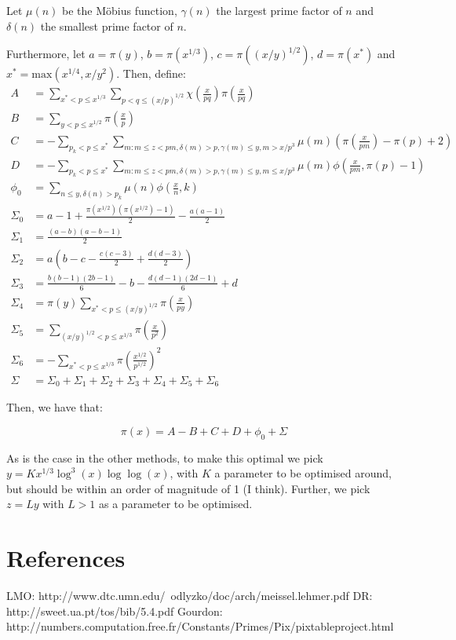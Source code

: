 \documentclass[12pt]{article}
\begin{document}
Let $\mu(n)$ be the M\"{o}bius function, $\gamma(n)$ the largest prime factor of $n$ and $\delta(n)$ the smallest prime factor of $n$.

Furthermore, let $a=\pi\left(y\right)$, $b=\pi\left(x^{1/3}\right)$, $c=\pi\left((x/y)^{1/2}\right)$, $d=\pi\left(x^*\right)$
and $x^*=\mathrm{max}\left(x^{1/4}, x/y^2\right)$. Then, define:
\begin{align*}
  A &= \sum_{x^* < p \leq x^{1/3}}\sum_{p < q \leq (x/p)^{1/2}}\chi\left(\frac{x}{pq}\right)\pi\left(\frac{x}{pq}\right)\\
  B &= \sum_{y < p \leq x^{1/2}}\pi\left(\frac{x}{p}\right)\\
  C &= -\sum_{p_k < p \leq x^*} \sum_{m: m\leq z<pm,\delta(m)>p,\gamma(m)\leq y, m>x/p^3}\mu(m)\left(\pi\left(\frac{x}{pm}\right)-\pi(p)+2\right)\\
  D &= -\sum_{p_k < p \leq x^*} \sum_{m: m\leq z<pm,\delta(m)>p,\gamma(m)\leq y, m\leq x/p^3}\mu(m)\phi\left(\frac{x}{pm},\pi(p)-1\right)\\
  \phi_0 &= \sum_{n\leq y,\delta(n) >p_k}\mu(n)\phi\left(\frac{x}{n}, k\right)\\
  \Sigma_0 &= a - 1 + \frac{\pi\left(x^{1/2}\right)\left(\pi\left(x^{1/2}\right) - 1\right)}{2} - \frac{a(a-1)}{2}\\
  \Sigma_1 &= \frac{(a-b)(a-b-1)}{2}\\
  \Sigma_2 &= a\left(b - c - \frac{c(c-3)}{2} + \frac{d(d-3)}{2}\right)\\
  \Sigma_3 &= \frac{b(b-1)(2b-1)}{6} - b - \frac{d(d-1)(2d-1)}{6} + d\\
  \Sigma_4 &= \pi(y) \sum_{x^* < p \leq (x/y)^{1/2}}\pi\left(\frac{x}{py}\right)\\
  \Sigma_5 &= \sum_{(x/y)^{1/2} < p \leq x^{1/3}}\pi\left(\frac{x}{p^2}\right)\\
  \Sigma_6 &= -\sum_{x^* < p \leq x^{1/3}}\pi\left(\frac{x^{1/2}}{p^{1/2}}\right)^2\\
  \Sigma &= \Sigma_0 + \Sigma_1 + \Sigma_2 + \Sigma_3 + \Sigma_4 + \Sigma_5 + \Sigma_6
\end{align*}

Then, we have that:

\[
  \pi(x) = A - B + C + D + \phi_0 + \Sigma  
\]

As is the case in the other methods, to make this optimal we pick $y=Kx^{1/3}\log^3(x)\log\log(x)$, with $K$ a parameter to be optimised around,
but should be within an order of magnitude of 1 (I think). Further, we pick $z = Ly$ with $L>1$ as a parameter to be optimised.

\section{References}
LMO: http://www.dtc.umn.edu/~odlyzko/doc/arch/meissel.lehmer.pdf
DR: http://sweet.ua.pt/tos/bib/5.4.pdf
Gourdon: http://numbers.computation.free.fr/Constants/Primes/Pix/pixtableproject.html
\end{document}
